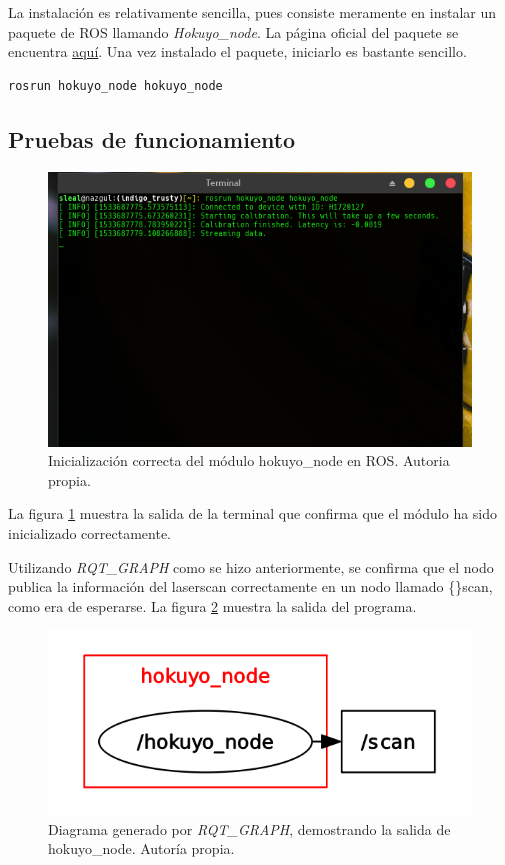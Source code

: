 La instalación es relativamente sencilla, pues consiste meramente en instalar un paquete de ROS llamando \textit{Hokuyo\_node}. La página oficial del paquete se encuentra \href{http://wiki.ros.org/hokuyo_node}{aquí}. Una vez instalado el paquete, iniciarlo es bastante sencillo.

\begin{lstlisting}
rosrun hokuyo_node hokuyo_node
\end{lstlisting}

\subsection{Pruebas de funcionamiento}

\begin{figure}[h!]
\centering
\includegraphics[scale=0.6]{imagenes/hokuyorosrun.png}
\caption{Inicialización correcta del módulo hokuyo\_node en ROS. Autoria propia.}
\label{F:hokuyonode}
\end{figure}

La figura \ref{F:hokuyonode} muestra la salida de la terminal que confirma que el módulo ha sido inicializado correctamente.

Utilizando \textit{RQT\_GRAPH} como se hizo anteriormente, se confirma que el nodo publica la información del laserscan correctamente en un nodo llamado \{\}scan, como era de esperarse. La figura \ref{F:hokuyorqtgraph} muestra la salida del programa.

\begin{figure}[h!]
\centering
\includegraphics[scale=0.6]{imagenes/hokuyo_rqt_graph.png}
\caption{Diagrama generado por \textit{RQT\_GRAPH}, demostrando la salida de hokuyo\_node. Autoría propia.}
\label{F:hokuyorqtgraph}
\end{figure}

